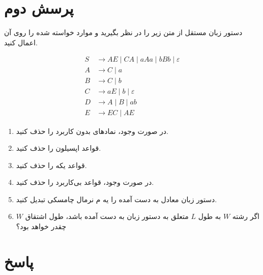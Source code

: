 \section*{پرسش دوم}


دستور زبان مستقل از متن زیر را در نظر بگیرید و موارد خواسته شده را روی آن اعمال کنید. 

\[
\begin{aligned}
	S &\rightarrow AE \mid CA \mid aAa \mid bBb \mid \varepsilon \\
	A &\rightarrow C \mid a \\
	B &\rightarrow C \mid b \\
	C &\rightarrow aE \mid b \mid \varepsilon \\
	D &\rightarrow A \mid B \mid ab \\
	E &\rightarrow EC \mid AE
\end{aligned}
\]




\begin{enumerate}
	
	\item {در صورت وجود، نمادهای بدون کاربرد را حذف کنید.} 
	\item {قواعد اپسیلون را حذف کنید.} 
	\item {قواعد یکه را حذف کنید.} 
	\item {در صورت وجود، قواعد بی‌کاربرد را حذف کنید.} 
	\item {دستور زبان معادل به دست آمده را یه م نرمال چامسکی تبدیل کنید.} 
	\item {اگر رشته \( W \) به طول \( L \) متعلق به دستور زبان به دست آمده باشد، طول اشتقاق \( W \) چقدر خواهد بود؟ } 
	
\end{enumerate}

\section*{پاسخ}


